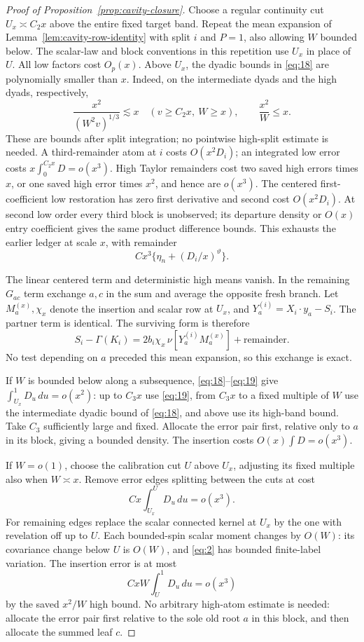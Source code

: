 \begin{proof}[Proof of Proposition~\ref{prop:cavity-closure}]
Choose a regular continuity cut \(U_x\asymp C_2x\)
above the entire fixed target band. Repeat the
mean expansion of Lemma~\ref{lem:cavity-row-identity}
with split \(i\) and \(P=1\), also allowing \(W\)
bounded below. The scalar-law and block conventions in this repetition
use \(U_x\) in place of \(U\). All low factors cost \(O_p(x)\).
Above \(U_x\), the dyadic bounds in \eqref{eq:18} are
polynomially smaller than \(x\). Indeed, on the intermediate
dyads and the high dyads, respectively,
\[
 \frac{x^2}{(W^2v)^{1/3}}\lesssim x
       \quad(v\ge C_2x,\ W\ge x),
 \qquad \frac{x^2}{W}\le x.
\]
These are bounds after split integration; no pointwise high-split
estimate is needed. A third-remainder atom at \(i\)
costs \(O(x^2D_i)\); an integrated low error
costs \(x\int_0^{C_2x}D=o(x^3)\).
High Taylor remainders cost two saved high
errors times \(x\), or one saved high error
times \(x^2\), and hence are \(o(x^3)\).
The centered first-coefficient
low restoration has zero first derivative
and second cost \(O(x^2D_i)\).
At second low order every third block is
unobserved; its departure density or \(O(x)\)
entry coefficient gives the same product
difference bounds. This exhausts the earlier
ledger at scale \(x\), with remainder
\[
                       Cx^3\{\eta_n+(D_i/x)^\vartheta\}.
\]

The linear centered term and deterministic high
means vanish. In the remaining \(G_{ac}\) term
exchange \(a,c\) in the sum and average the
opposite fresh branch. Let \(M_a^{(x)},\chi_x\)
denote the insertion and scalar row at \(U_x\),
and \(Y_a^{(i)}=X_i\cdot y_a-S_i\).
The partner term is identical. The surviving
form is therefore
\[
 S_i-\Gamma(K_i)=
       2b_i\chi_x\,\nu[Y_a^{(i)}M_a^{(x)}]
                                      +\text{remainder}.
\]
No test depending on \(a\) preceded this mean
expansion, so this exchange is exact.

If \(W\) is bounded below along a subsequence,
\eqref{eq:18}--\eqref{eq:19} give
\(\int_{U_x}^1D_u\,du=o(x^2)\):
up to \(C_3x\) use \eqref{eq:19}, from
\(C_3x\) to a fixed multiple of \(W\) use
the intermediate dyadic bound of
\eqref{eq:18}, and above use its high-band
bound. Take \(C_3\) sufficiently large and
fixed. Allocate the error pair first,
relative only to \(a\) in its block, giving
a bounded density. The insertion costs
\(O(x)\int D=o(x^3)\).

If \(W=o(1)\), choose the calibration cut
\(U\) above \(U_x\), adjusting its fixed
multiple also when \(W\asymp x\).
Remove error edges splitting between the
cuts at cost
\[
                        Cx\int_{U_x}^{U}D_u\,du=o(x^3).
\]
For remaining edges replace the scalar
connected kernel at \(U_x\) by the one
with revelation off up to \(U\).
Each bounded-spin scalar moment changes
by \(O(W)\): its covariance change below
\(U\) is \(O(W)\), and \eqref{eq:2}
has bounded finite-label variation.
The insertion error is at most
\[
                             CxW\int_U^1D_u\,du=o(x^3)
\]
by the saved \(x^2/W\) high bound.
No arbitrary high-atom estimate is needed:
allocate the error pair first relative
to the sole old root \(a\) in this block,
and then allocate the summed leaf \(c\).


\end{proof}
